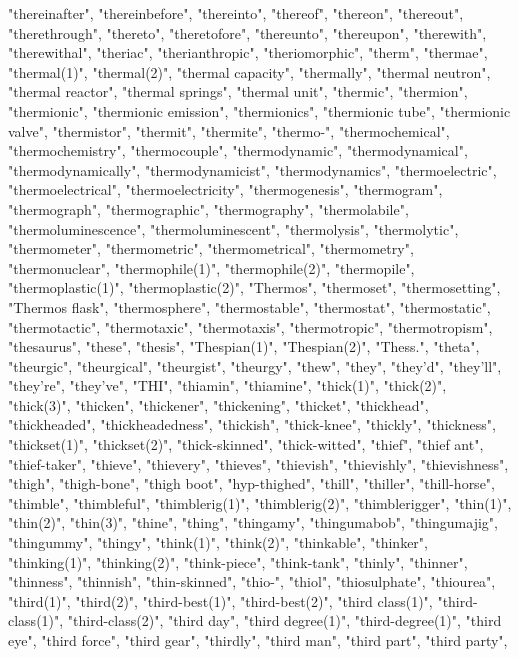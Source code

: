 "thereinafter",
"thereinbefore",
"thereinto",
"thereof",
"thereon",
"thereout",
"therethrough",
"thereto",
"theretofore",
"thereunto",
"thereupon",
"therewith",
"therewithal",
"theriac",
"therianthropic",
"theriomorphic",
"therm",
"thermae",
"thermal(1)",
"thermal(2)",
"thermal capacity",
"thermally",
"thermal neutron",
"thermal reactor",
"thermal springs",
"thermal unit",
"thermic",
"thermion",
"thermionic",
"thermionic emission",
"thermionics",
"thermionic tube",
"thermionic valve",
"thermistor",
"thermit",
"thermite",
"thermo-",
"thermochemical",
"thermochemistry",
"thermocouple",
"thermodynamic",
"thermodynamical",
"thermodynamically",
"thermodynamicist",
"thermodynamics",
"thermoelectric",
"thermoelectrical",
"thermoelectricity",
"thermogenesis",
"thermogram",
"thermograph",
"thermographic",
"thermography",
"thermolabile",
"thermoluminescence",
"thermoluminescent",
"thermolysis",
"thermolytic",
"thermometer",
"thermometric",
"thermometrical",
"thermometry",
"thermonuclear",
"thermophile(1)",
"thermophile(2)",
"thermopile",
"thermoplastic(1)",
"thermoplastic(2)",
"Thermos",
"thermoset",
"thermosetting",
"Thermos flask",
"thermosphere",
"thermostable",
"thermostat",
"thermostatic",
"thermotactic",
"thermotaxic",
"thermotaxis",
"thermotropic",
"thermotropism",
"thesaurus",
"these",
"thesis",
"Thespian(1)",
"Thespian(2)",
"Thess.",
"theta",
"theurgic",
"theurgical",
"theurgist",
"theurgy",
"thew",
"they",
"they'd",
"they'll",
"they're",
"they've",
"THI",
"thiamin",
"thiamine",
"thick(1)",
"thick(2)",
"thick(3)",
"thicken",
"thickener",
"thickening",
"thicket",
"thickhead",
"thickheaded",
"thickheadedness",
"thickish",
"thick-knee",
"thickly",
"thickness",
"thickset(1)",
"thickset(2)",
"thick-skinned",
"thick-witted",
"thief",
"thief ant",
"thief-taker",
"thieve",
"thievery",
"thieves",
"thievish",
"thievishly",
"thievishness",
"thigh",
"thigh-bone",
"thigh boot",
"hyp-thighed",
"thill",
"thiller",
"thill-horse",
"thimble",
"thimbleful",
"thimblerig(1)",
"thimblerig(2)",
"thimblerigger",
"thin(1)",
"thin(2)",
"thin(3)",
"thine",
"thing",
"thingamy",
"thingumabob",
"thingumajig",
"thingummy",
"thingy",
"think(1)",
"think(2)",
"thinkable",
"thinker",
"thinking(1)",
"thinking(2)",
"think-piece",
"think-tank",
"thinly",
"thinner",
"thinness",
"thinnish",
"thin-skinned",
"thio-",
"thiol",
"thiosulphate",
"thiourea",
"third(1)",
"third(2)",
"third-best(1)",
"third-best(2)",
"third class(1)",
"third-class(1)",
"third-class(2)",
"third day",
"third degree(1)",
"third-degree(1)",
"third eye",
"third force",
"third gear",
"thirdly",
"third man",
"third part",
"third party",
